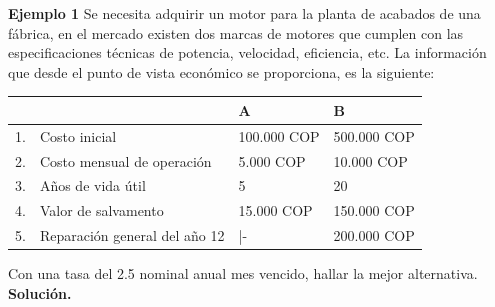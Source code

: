 
\textbf{Ejemplo 1}\newline
Se necesita adquirir un motor para la planta de acabados de una fábrica, en el mercado existen dos marcas de motores que cumplen con las especificaciones técnicas de potencia, velocidad, eficiencia, etc.
La información que desde el punto de vista económico se proporciona, es la siguiente:\\ 
\begin{center}
		\begin{tabular}{|l|l|l|l|}
			
			\hline
			   &                               & A       & B       \\ \hline
			1. & Costo inicial                 & 100.000 COP & 500.000 COP \\ \hline
			2. & Costo mensual de operación    & 5.000 COP   & 10.000 COP \\ \hline
			3. & Años de vida útil             & 5       & 20      \\ \hline
			4. & Valor de salvamento           & 15.000 COP  & 150.000 COP \\ \hline
			5. & Reparación general del año 12 & |-      & 200.000 COP \\ \hline
		\end{tabular}
  \hspace{1cm}
\end{center}

Con una tasa del 2.5 nominal anual mes vencido, hallar la mejor alternativa. \\

\textbf{Solución.}\\



